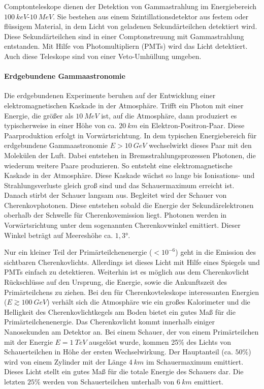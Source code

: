 Comptonteleskope dienen der Detektion von Gammastrahlung im Energiebereich $\SI{100}{keV}$-$\SI{10}{MeV}$.
Sie bestehen aus einem Szintillationsdetektor aus festem oder flüssigem Material, in dem Licht von geladenen Sekundärteilchen detektiert wird.
Diese Sekundärteilchen sind in einer Comptonstreuung mit Gammastrahlung entstanden.
Mit Hilfe von Photomultipliern (PMTs) wird das Licht detektiert.
Auch diese Teleskope sind von einer Veto-Umhüllung umgeben.\cite{Weekes}

\paragraph{Erdgebundene Gammaastronomie}
Die erdgebundenen Experimente beruhen auf der Entwicklung einer elektromagnetischen Kaskade in der Atmosphäre.
Trifft ein Photon mit einer Energie, die größer als $\SI{10}{MeV}$ ist, auf die Atmosphäre, dann produziert es typischerweise in einer Höhe von ca. $\SI{20}{km}$ ein Elektron-Positron-Paar.
Diese Paarproduktion erfolgt in Vorwärtsrichtung.
In dem typischen Energiebereich für erdgebundene Gammaastronomie $E>\SI{10}{GeV}$ wechselwirkt dieses Paar mit den Molekülen der Luft.
Dabei entstehen in Bremsstrahlungsprozessen Photonen, die wiederum weitere Paare produzieren.
So entsteht eine elektromagnetische Kaskade in der Atmosphäre.
Diese Kaskade wächst so lange bis Ionisations- und Strahlungsverluste gleich groß sind und das Schauermaximum erreicht ist.
Danach stirbt der Schauer langsam aus.
Begleitet wird der Schauer von Cherenkovphotonen.
Diese entstehen sobald die Energie der Sekundärelektronen oberhalb der Schwelle für Cherenkovemission liegt.
Photonen werden in Vorwärtsrichtung unter dem sogenannten Cherenkovwinkel emittiert. 
Dieser Winkel beträgt auf Meereshöhe ca. $1,3°$.\cite{Weekes}

Nur ein kleiner Teil der Primärteilchenenergie ($<10^{-6}$) geht in die Emission des sichtbaren Cherenkovlichts.
Allerdings ist dieses Licht mit Hilfe eines Spiegels und PMTs einfach zu detektieren.
Weiterhin ist es möglich aus dem Cherenkovlicht Rückschlüsse auf den Ursprung, die Energie, sowie die Ankunftszeit des Primärteilchens zu ziehen.
Bei den für Cherenkovteleskope interessanten Energien ($E\gtrsim \SI{100}{GeV}$) verhält sich die Atmosphäre wie ein großes Kalorimeter und die Helligkeit des Cherenkovlichtkegels am Boden bietet ein gutes Maß für die Primärteilchenenergie.
Das Cherenkovlicht kommt innerhalb einiger Nanosekunden am Detektor an.
Bei einem Schauer, der von einem Primärteilchen mit der Energie $E=\SI{1}{TeV}$ ausgelöst wurde, kommen 25\% des Lichts von Schauerteilchen in Höhe der ersten Wechselwirkung.
Der Hauptanteil (ca. $50\%$) wird von einem Zylinder mit der Länge $\SI{4}{km}$ im Schauermaximum emittiert.
Dieses Licht stellt ein gutes Maß für die totale Energie des Schauers dar.
Die letzten $25\%$ werden von Schauerteilchen unterhalb von $\SI{6}{km}$ emittiert.\cite{Weekes}

